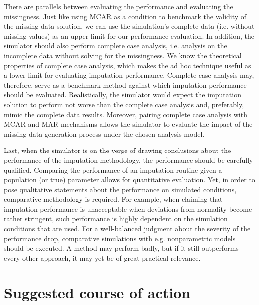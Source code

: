 \documentclass[bimj,fleqn]{w-art}
\begin{document}
There are parallels between evaluating the performance and evaluating the missingness. Just like using MCAR as a condition to benchmark the validity of the missing data solution, we can use the simulation's complete data (i.e. without missing values) as an upper limit for our performance evaluation. In addition, the simulator should also perform complete case analysis, i.e. analysis on the incomplete data without solving for the missingness. We know the theoretical properties of complete case analysis, which makes the ad hoc technique useful as a lower limit for evaluating imputation performance. Complete case analysis may, therefore, serve as a benchmark method against which imputation performance should be evaluated. Realistically, the simulator would expect the imputation solution to perform not worse than the complete case analysis and, preferably, mimic the complete data results. Moreover, pairing complete case analysis with MCAR and MAR mechanisms allows the simulator to evaluate the impact of the missing data generation process under the chosen analysis model.



Last, when the simulator is on the verge of drawing conclusions about the performance of the imputation methodology, the performance should be carefully qualified. Comparing the performance of an imputation routine given a population (or true) parameter allows for quantitative evaluation. Yet, in order to pose qualitative statements about the performance on simulated conditions, comparative methodology is required. For example, when claiming that imputation performance is unacceptable when deviations from normality become rather stringent, such performance is highly dependent on the simulation conditions that are used. For a well-balanced judgment about the severity of the performance drop, comparative simulations with e.g. nonparametric models should be executed. A method may perform badly, but if it still outperforms every other approach, it may yet be of great practical relevance.



\section{Suggested course of action}
\end{document}
